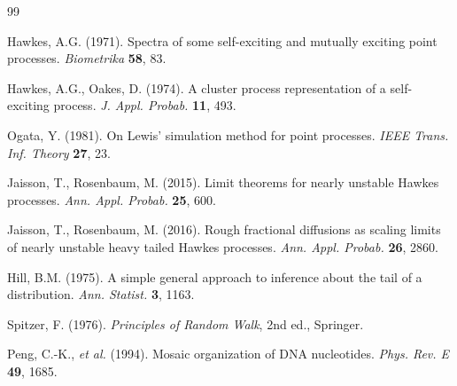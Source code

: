 \documentclass[11pt,a4paper]{article}
\begin{document}
\begin{thebibliography}{99}

 Hawkes, A.G. (1971). Spectra of some self-exciting and mutually exciting point processes. \emph{Biometrika} \textbf{58}, 83.

 Hawkes, A.G., Oakes, D. (1974). A cluster process representation of a self-exciting process. \emph{J. Appl. Probab.} \textbf{11}, 493.

 Ogata, Y. (1981). On Lewis' simulation method for point processes. \emph{IEEE Trans. Inf. Theory} \textbf{27}, 23.

 Jaisson, T., Rosenbaum, M. (2015). Limit theorems for nearly unstable Hawkes processes. \emph{Ann. Appl. Probab.} \textbf{25}, 600.

 Jaisson, T., Rosenbaum, M. (2016). Rough fractional diffusions as scaling limits of nearly unstable heavy tailed Hawkes processes. \emph{Ann. Appl. Probab.} \textbf{26}, 2860.

 Hill, B.M. (1975). A simple general approach to inference about the tail of a distribution. \emph{Ann. Statist.} \textbf{3}, 1163.

 Spitzer, F. (1976). \emph{Principles of Random Walk}, 2nd ed., Springer.

 Peng, C.-K., \emph{et al.} (1994). Mosaic organization of DNA nucleotides. \emph{Phys. Rev. E} \textbf{49}, 1685.

\end{thebibliography}
\end{document}
